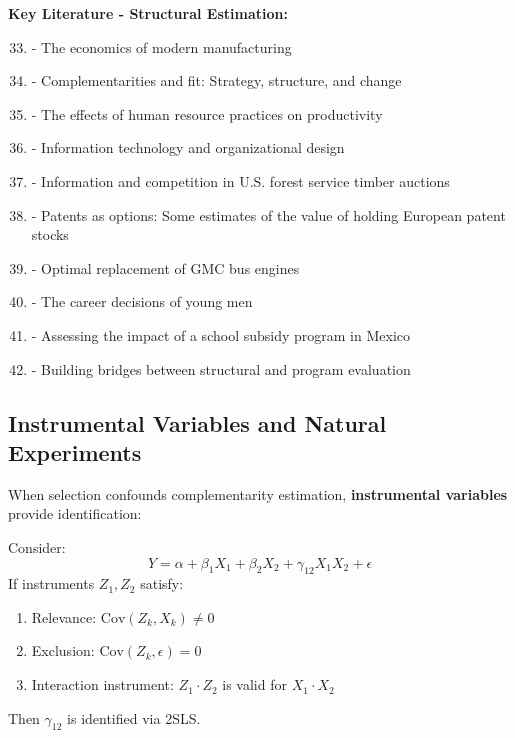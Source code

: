 \textbf{Key Literature - Structural Estimation:}
\begin{enumerate}[noitemsep]
    \setcounter{enumi}{32}
    \item \citet{milgrom1990b} - The economics of modern manufacturing
    \item \citet{milgrom1995} - Complementarities and fit: Strategy, structure, and change
    \item \citet{ichniowski1997} - The effects of human resource practices on productivity
    \item \citet{brynjolfsson2002} - Information technology and organizational design
    \item \citet{athey2001} - Information and competition in U.S. forest service timber auctions
    \item \citet{pakes1986} - Patents as options: Some estimates of the value of holding European patent stocks
    \item \citet{rust1987} - Optimal replacement of GMC bus engines
    \item \citet{keane1997} - The career decisions of young men
    \item \citet{todd2006} - Assessing the impact of a school subsidy program in Mexico
    \item \citet{heckman2010} - Building bridges between structural and program evaluation
\end{enumerate}

\subsection{Instrumental Variables and Natural Experiments}
\label{subsec:iv-methods}

When selection confounds complementarity estimation, \textbf{instrumental variables} provide identification:

\begin{theorem}
Consider:
\begin{equation}
Y = \alpha + \beta_1 X_1 + \beta_2 X_2 + \gamma_{12} X_1 X_2 + \epsilon
\end{equation}
If instruments $Z_1, Z_2$ satisfy:
\begin{enumerate}
    \item Relevance: $\text{Cov}(Z_k, X_k) \neq 0$
    \item Exclusion: $\text{Cov}(Z_k, \epsilon) = 0$
    \item Interaction instrument: $Z_1 \cdot Z_2$ is valid for $X_1 \cdot X_2$
\end{enumerate}
Then $\gamma_{12}$ is identified via 2SLS.
\end{theorem}


